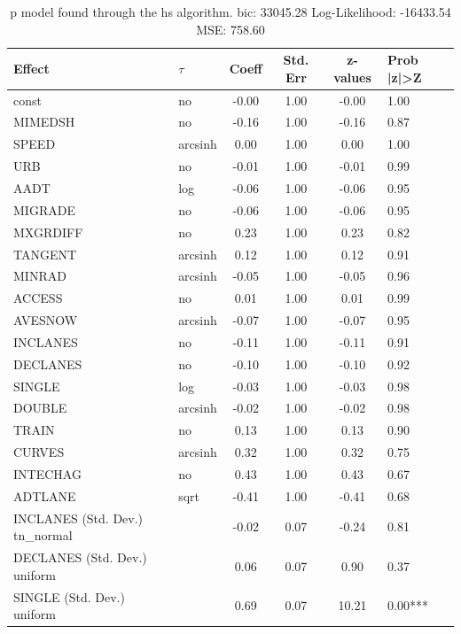 \begin{table}
	\caption{p model found through the hs algorithm. bic: 33045.28 Log-Likelihood: -16433.54 MSE: 758.60}
	\begin{center}
		\begin{tabular}{|l|l|c|c|c|l|}
			\hline
			Effect & $\tau$ & Coeff & Std. Err & z-values & Prob |z|>Z \\
			\hline
			const & no & -0.00 & 1.00 & -0.00 & 1.00 \\
			\hline
			MIMEDSH & no & -0.16 & 1.00 & -0.16 & 0.87 \\
			\hline
			SPEED & arcsinh & 0.00 & 1.00 & 0.00 & 1.00 \\
			\hline
			URB & no & -0.01 & 1.00 & -0.01 & 0.99 \\
			\hline
			AADT & log & -0.06 & 1.00 & -0.06 & 0.95 \\
			\hline
			MIGRADE & no & -0.06 & 1.00 & -0.06 & 0.95 \\
			\hline
			MXGRDIFF & no & 0.23 & 1.00 & 0.23 & 0.82 \\
			\hline
			TANGENT & arcsinh & 0.12 & 1.00 & 0.12 & 0.91 \\
			\hline
			MINRAD & arcsinh & -0.05 & 1.00 & -0.05 & 0.96 \\
			\hline
			ACCESS & no & 0.01 & 1.00 & 0.01 & 0.99 \\
			\hline
			AVESNOW & arcsinh & -0.07 & 1.00 & -0.07 & 0.95 \\
			\hline
			INCLANES & no & -0.11 & 1.00 & -0.11 & 0.91 \\
			\hline
			DECLANES & no & -0.10 & 1.00 & -0.10 & 0.92 \\
			\hline
			SINGLE & log & -0.03 & 1.00 & -0.03 & 0.98 \\
			\hline
			DOUBLE & arcsinh & -0.02 & 1.00 & -0.02 & 0.98 \\
			\hline
			TRAIN & no & 0.13 & 1.00 & 0.13 & 0.90 \\
			\hline
			CURVES & arcsinh & 0.32 & 1.00 & 0.32 & 0.75 \\
			\hline
			INTECHAG & no & 0.43 & 1.00 & 0.43 & 0.67 \\
			\hline
			ADTLANE & sqrt & -0.41 & 1.00 & -0.41 & 0.68 \\
			\hline
			INCLANES (Std. Dev.) tn_normal &  & -0.02 & 0.07 & -0.24 & 0.81 \\
			\hline
			DECLANES (Std. Dev.) uniform &  & 0.06 & 0.07 & 0.90 & 0.37 \\
			\hline
			SINGLE (Std. Dev.) uniform &  & 0.69 & 0.07 & 10.21 & 0.00*** \\

\end{tabular}
\end{center}
\end{table}

